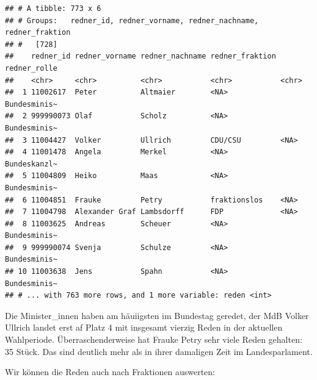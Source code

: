\documentclass[oneside, 12pt, numbers=endperiod]{scrbook}
\newenvironment{Shaded}{\begin{snugshade}}{\end{snugshade}}
\newcommand{\DataTypeTok}[1]{\textcolor[rgb]{0.13,0.29,0.53}{#1}}
\newcommand{\KeywordTok}[1]{\textcolor[rgb]{0.13,0.29,0.53}{\textbf{#1}}}
\newcommand{\NormalTok}[1]{#1}
\newcommand{\OperatorTok}[1]{\textcolor[rgb]{0.81,0.36,0.00}{\textbf{#1}}}
\newcommand{\OtherTok}[1]{\textcolor[rgb]{0.56,0.35,0.01}{#1}}
\newcommand{\StringTok}[1]{\textcolor[rgb]{0.31,0.60,0.02}{#1}}
\theoremstyle{definition}
\theoremstyle{definition}
\theoremstyle{definition}
\theoremstyle{remark}
\begin{document}
\begin{Shaded}
\end{Shaded}

\begin{verbatim}
## # A tibble: 773 x 6
## # Groups:   redner_id, redner_vorname, redner_nachname, redner_fraktion
## #   [728]
##    redner_id redner_vorname redner_nachname redner_fraktion redner_rolle
##    <chr>     <chr>          <chr>           <chr>           <chr>       
##  1 11002617  Peter          Altmaier        <NA>            Bundesminis~
##  2 999990073 Olaf           Scholz          <NA>            Bundesminis~
##  3 11004427  Volker         Ullrich         CDU/CSU         <NA>        
##  4 11001478  Angela         Merkel          <NA>            Bundeskanzl~
##  5 11004809  Heiko          Maas            <NA>            Bundesminis~
##  6 11004851  Frauke         Petry           fraktionslos    <NA>        
##  7 11004798  Alexander Graf Lambsdorff      FDP             <NA>        
##  8 11003625  Andreas        Scheuer         <NA>            Bundesminis~
##  9 999990074 Svenja         Schulze         <NA>            Bundesminis~
## 10 11003638  Jens           Spahn           <NA>            Bundesminis~
## # ... with 763 more rows, and 1 more variable: reden <int>
\end{verbatim}

Die Minister\_innen haben am häuiigsten im Bundestag geredet, der MdB
Volker Ullrich landet erst af Platz 4 mit insgesamt vierzig Reden in der
aktuellen Wahlperiode. Überraschenderweise hat Frauke Petry sehr viele
Reden gehalten: 35 Stück. Das sind deutlich mehr als in ihrer damaligen
Zeit im Landesparlament.

Wir können die Reden auch nach Fraktionen auswerten:

\begin{Shaded}
\end{Shaded}
\end{document}
